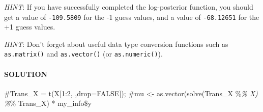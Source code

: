 \documentclass[
]{article}
\begin{document}
\emph{HINT}: If you have successfully completed the log-posterior
function, you should get a value of \texttt{-109.5809} for the -1 guess
values, and a value of \texttt{-68.12651} for the +1 guess values.

\emph{HINT}: Don't forget about useful data type conversion functions
such as \texttt{as.matrix()} and \texttt{as.vector()} (or
\texttt{as.numeric()}).

\hypertarget{solution-2}{%
\paragraph{SOLUTION}\label{solution-2}}

\#Trans\_X = t(X{[}1:2, ,drop=FALSE{]}); \#mu \textless-
as.vector(solve(Trans\_X \%\emph{\% X) \%}\% Trans\_X) * my\_info\$y
\end{document}
